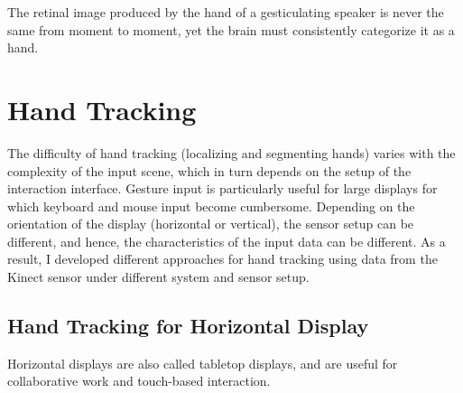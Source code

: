 \begin{savequote}
The retinal image produced by the hand of a gesticulating
speaker is never the same from moment to moment, yet the brain must consistently categorize
it as a hand. 
\end{savequote}
\chapter{Hand Tracking}

% 

The difficulty of hand tracking (localizing and segmenting hands) varies with
the complexity of the input scene, which in turn depends on the setup of the
interaction interface.
Gesture input is particularly useful for large displays for which keyboard and
mouse input become cumbersome. Depending on the orientation of the display
(horizontal or vertical), the sensor setup can be different, and hence, the
characteristics of the input data can be different. As a result, I developed different approaches for hand tracking using data from the Kinect sensor under different system and sensor setup.

\section{Hand Tracking for Horizontal Display}
Horizontal displays are also called tabletop displays, and are useful for
collaborative work and touch-based interaction. 

